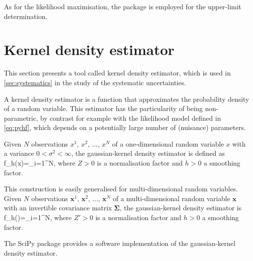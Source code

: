 As for the likelihood maximisation, the \pyhf package \cite{Heinrich2021} is employed for the upper-limit determination.
\section{Kernel density estimator} \label{sec:da_kernel}
This section presents a tool called kernel density estimator, which is used in \cref{sec:systematics} in the study of the systematic uncertainties.

A kernel density estimator \cite{10.1214/aoms/1177704472, 10.1214/aoms/1177728190} is a function that approximates the probability density of a random variable.
This estimator has the particularity of being non-parametric, by contrast for example with the likelihood model defined in \cref{eq:pyhf}, which depends on a potentially large number of (nuisance) parameters.

Given $N$ observations $x^1,\,x^2,\,...,\,x^N$ of a one-dimensional random variable $x$ with a variance $0<\sigma^2<\infty$, the gaussian-kernel density estimator is defined as
\be
f_h(x)=\sum_{i=1}^N\exp{},
\ee
where $Z>0$ is a normalisation factor and $h>0$ a smoothing factor.

This construction is easily generalised for multi-dimensional random variables.
Given $N$ observations $\mathbf{x}^1,\,\mathbf{x}^2,\,...,\,\mathbf{x}^N$ of a multi-dimensional random variable $\mathbf{x}$ with an invertible covariance matrix $\mathbf{\Sigma}$, the gaussian-kernel density estimator is
\be \label{eq:2dkde}
f_h()=\sum_{i=1}^N\exp{},
\ee
where $Z'>0$ is a normalisation factor and $h>0$ a smoothing factor.

The SciPy package \cite{2020SciPy-NMeth} provides a software implementation of the gaussian-kernel density estimator.
